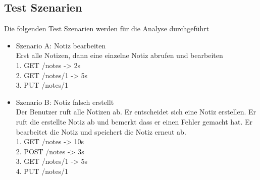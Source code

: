 \subsection{Test Szenarien}
Die folgenden Test Szenarien werden für die Analyse durchgeführt
\begin{itemize}
    \item Szenario A: Notiz bearbeiten \\
        Erst alle Notizen, dann eine einzelne Notiz abrufen und bearbeiten \\
        1. GET /notes -> 2s     \\
        2. GET /notes/1 -> 5s   \\
        3. PUT /notes/1         \\
        
    \item Szenario B: Notiz falsch erstellt \\
    Der Benutzer ruft alle Notizen ab. Er entscheidet sich eine Notiz erstellen. Er ruft die erstellte Notiz ab und bemerkt dass er einen Fehler gemacht hat. Er bearbeitet die Notiz und speichert die Notiz erneut ab. \\
        1. GET /notes   -> 10s  \\
        2. POST /notes  -> 3s   \\
        3. GET /notes/1 -> 5s   \\
        4. PUT /notes/1
\end{itemize}
